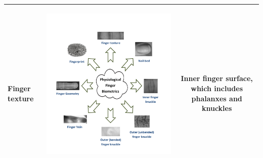 \documentclass[review]{elsarticle}
\begin{document}
\begin{table}[h]
{\begin{tabular}{|C{3.7cm}|C{3.7cm}|c|}
			\textbf{Finger texture}& \begin{minipage}{0.75\hsize}\includegraphics[page=1,scale=.5,trim=11cm 24.4cm 4cm 3.4cm,clip]{Finger_biometrics.pdf}\end{minipage}~~~~~& Inner finger surface, which includes phalanxes and knuckles \\ \hline
	\end{tabular}}
\end{table}
\end{document}
